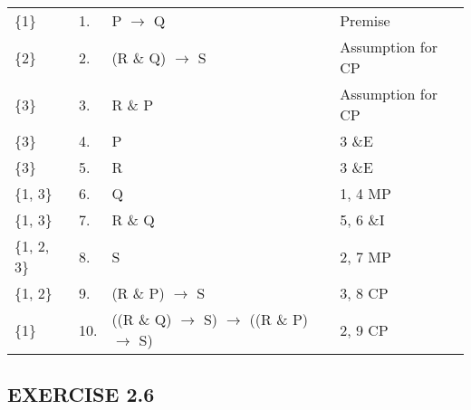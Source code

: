 \documentclass[a4paper,12pt]{article}
\newcommand{\mra}{$\rightarrow$ }
\begin{document}
\begin{enumerate}[label=\arabic*,leftmargin=*]
\begin{enumerate}[label=\arabic*.]
\begin{minipage}{\textwidth}
\begin{tabular}{l l l l}
                        \{1\} & 1. & P \mra Q & Premise\\
                        \{2\} & 2. & (R \& Q) \mra S & Assumption for CP\\
                        \{3\} & 3. & R \& P & Assumption for CP\\
                        \{3\} & 4. & P & 3 \&E\\
                        \{3\} & 5. & R & 3 \&E\\
                        \{1, 3\} & 6. & Q & 1, 4 MP\\
                        \{1, 3\} & 7. & R \& Q & 5, 6 \&I\\
                        \{1, 2, 3\} & 8. & S & 2, 7 MP\\
                        \{1, 2\} & 9. & (R \& P) \mra S & 3, 8 CP\\
                        \{1\} & 10. & ((R \& Q) \mra S) \mra ((R \& P) \mra S) & 2, 9 CP\\
                    \end{tabular}
                \end{minipage}

            \end{enumerate}

    \end{enumerate}

    \subsection*{EXERCISE 2.6}
\end{document}
